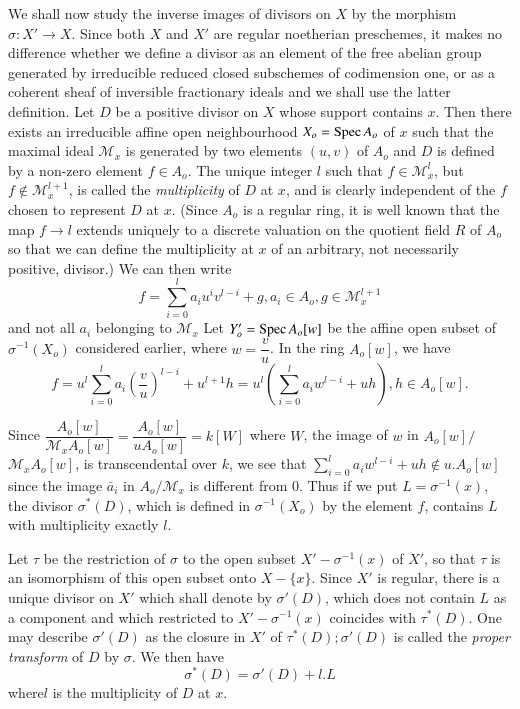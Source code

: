 We shall now study the inverse images of divisors on $X$ by the
morphism $\sigma: X' \rightarrow X$. Since both $X$ and $X'$ are
regular noetherian preschemes, it makes no difference whether we
define a divisor as an element of the free abelian group generated by
irreducible reduced closed subschemes of codimension one, or as a
coherent sheaf of inversible fractionary ideals and we shall use the
latter definition. Let $D$ be a positive divisor on $X$ whose support
contains $x$. Then there exists an irreducible affine open
neighbourhood $X_o = \operatorname{Spec} A_o$ of $x$ such that the maximal ideal
$\mathcal{M}_x$ is generated by two elements $(u,v)$ of $A_o$ and $D$
is defined by a non-zero element $f \in A_o$. The unique integer $l$
such that $f \in \mathcal{M}^l_x$, but $f \notin \mathcal{M}^{l+1}_x$,
is called the \textit{multiplicity} of $D$ at $x$, and is clearly independent
of the $f$ chosen to represent $D$ at $x$. (Since $A_o$ is a regular
ring, it is well known that the map $f \rightarrow l$ extends uniquely
to a discrete valuation on the quotient field $R$ of $A_o$ so that we
can define the multiplicity at $x$ of an arbitrary, not necessarily
positive, divisor.) We can then write 
$$ 
f = \sum^{l}_{i= 0} a_i u^i v^{l-i} + g, a_i \in A_o, g \in
\mathcal{M}^{l+1}_x 
$$\pageoriginale
and not all $a_i$ belonging to $\mathcal{M}_x$ Let $Y '_o =  \operatorname{Spec} A_o
[w]$ be the affine open subset of $\sigma^{-1} (X_o)$ considered
earlier, where $w =\dfrac{v}{u}$. In the ring $A_o [w]$, we have 
$$
f = u^l \sum^l_{i=0} a_i \left(\frac{v}{u}\right)^{l-i} + u^{l+1} h = u^l
\left(\sum^l_{i=0} a_i w^{l-i} + uh\right), h \in A_o [w]. 
$$

Since $\dfrac{A_o [w]}{\mathcal{M}_x A_o [w]} = \dfrac{A_o [w]}{u A_o
  [w]} = k[W]$ where $W$, the image of $w$ in $A_o [w]/$ $\mathcal{M}_x
A_o [w]$, is transcendental over $k$, we see that
$\sum\limits^{l}_{i=0} a_i w^{l-i} + uh \notin u.A_o [w]$ since the
image $\bar{a}_i$ in $A_o / \mathcal{M}_x$ is different from $0$. Thus
if we put $L = \sigma^{-1} (x)$, the divisor $\sigma^* (D)$, which is
defined in $\sigma^{-1} (X_o)$ by the element $f$, contains $L$ with
multiplicity exactly $l$. 

Let $\tau $ be the restriction of $\sigma$ to the open subset $X' -
\sigma^{-1} (x)$ of $X'$, so that $\tau$ is an isomorphism of this
open subset onto $X - \{ x \}$. Since $X'$ is regular, there is a
unique divisor on $X'$ which shall denote by $\sigma '(D)$, which does
not contain $L$ as a component and which restricted to $X' -
\sigma^{-1} (x)$ coincides with $\tau^* (D)$. One may describe $\sigma
'(D)$ as the closure in $X'$ of $\tau^*(D); \sigma'(D)$ is called the
\textit{proper transform} of $D$ by $\sigma$. We then have  
$$
\sigma^*(D) = \sigma '(D) + l. L
$$
where\pageoriginale $l$ is the multiplicity of $D$ at $x$.

